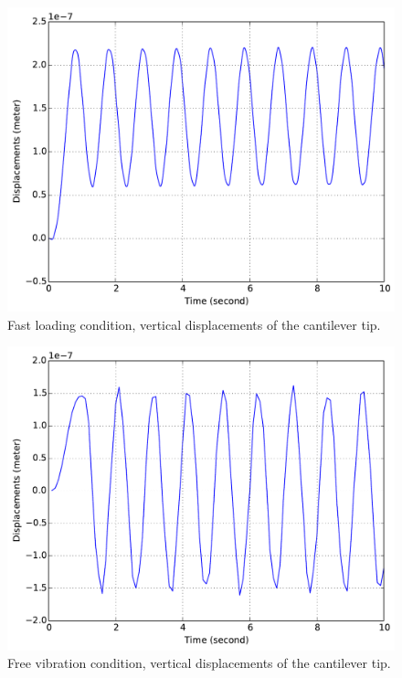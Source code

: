 \documentclass[fleqn,11pt]{article}
\begin{document}
\begin{figure}[!htb]
  \centering
  \includegraphics[width=12cm]{../Figure-files/_Chapter_Appendix_Illustrative_Examples/beam-5element-fastLoading.pdf}
  \caption{Fast loading condition, vertical displacements of the cantilever tip.}
  \label{fig_beam5_fast}
\end{figure}

\begin{figure}[!htb]
  \centering
  \includegraphics[width=12cm]{../Figure-files/_Chapter_Appendix_Illustrative_Examples/beam-5element-freeVibration.pdf}
  \caption{Free vibration condition, vertical displacements of the cantilever tip.}
  \label{fig_beam5_freevibration}
\end{figure}
\end{document}
